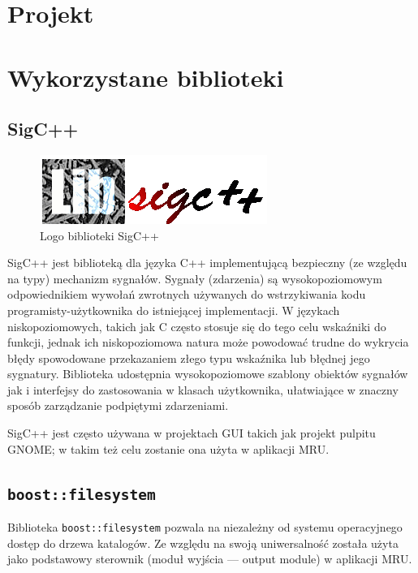 \section{Projekt}
\label{projekt}

\section{Wykorzystane biblioteki}
\label{wykorzystane-biblioteki}

\subsection{SigC++}
\begin{figure}
\begin{center}
\includegraphics[scale=0.50]{img/sigcpp_logo.png}
\end{center}
\caption{Logo biblioteki SigC++}
\end{figure}
\par
SigC++ jest biblioteką dla języka C++ implementującą bezpieczny (ze względu na typy) mechanizm sygnałów.
Sygnały (zdarzenia) są wysokopoziomowym odpowiednikiem wywołań zwrotnych używanych do wstrzykiwania kodu programisty-użytkownika do istniejącej implementacji. W językach niskopoziomowych, takich jak C często stosuje się do tego celu wskaźniki do funkcji, jednak ich niskopoziomowa natura może powodować trudne do wykrycia błędy spowodowane przekazaniem złego typu wskaźnika lub błędnej jego sygnatury. Biblioteka udostępnia wysokopoziomowe szablony obiektów sygnałów jak i interfejsy do zastosowania w klasach użytkownika, ułatwiające w znaczny sposób zarządzanie podpiętymi zdarzeniami.\\
\par
SigC++ jest często używana w projektach GUI takich jak projekt pulpitu GNOME; w takim też celu zostanie ona użyta w aplikacji MRU.

\subsection{\texttt{boost::filesystem}}
\par
Biblioteka \texttt{boost::filesystem} pozwala na niezależny od systemu operacyjnego dostęp do drzewa katalogów. Ze względu na swoją uniwersalność została użyta jako podstawowy sterownik (moduł wyjścia --- output module) w aplikacji MRU.

